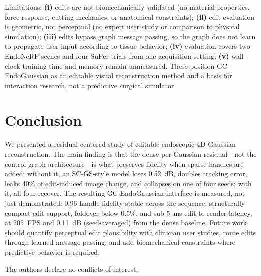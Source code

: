 \documentclass[ASNA,twocolumn]{USG} %
\begin{document}
Limitations: \textbf{(i)} edits are not biomechanically validated (no material properties, force response, cutting mechanics, or anatomical constraints); \textbf{(ii)} edit evaluation is geometric, not perceptual (no expert user study or comparison to physical simulation); \textbf{(iii)} edits bypass graph message passing, so the graph does not learn to propagate user input according to tissue behavior; \textbf{(iv)} evaluation covers two EndoNeRF scenes and four SuPer trials from one acquisition setting; \textbf{(v)} wall-clock training time and memory remain unmeasured. These position GC-EndoGaussian as an editable visual reconstruction method and a basis for interaction research, not a predictive surgical simulator.

\section{Conclusion}\label{sec7}

We presented a residual-centered study of editable endoscopic 4D Gaussian reconstruction. The main finding is that the dense per-Gaussian residual---not the control-graph architecture---is what preserves fidelity when sparse handles are added: without it, an SC-GS-style model loses 0.52~dB, doubles tracking error, leaks 40\% of edit-induced image change, and collapses on one of four seeds; with it, all four recover. The resulting GC-EndoGaussian interface is measured, not just demonstrated: 0.96 handle fidelity stable across the sequence, structurally compact edit support, foldover below 0.5\%, and sub-5~ms edit-to-render latency, at 205~FPS and 0.11~dB (seed-averaged) from the dense baseline. Future work should quantify perceptual edit plausibility with clinician user studies, route edits through learned message passing, and add biomechanical constraints where predictive behavior is required.



The authors declare no conflicts of interest.


\end{document}
